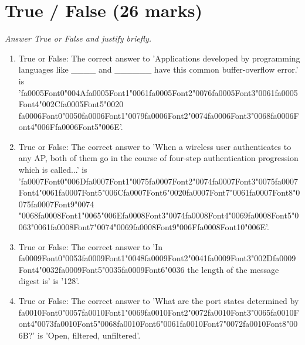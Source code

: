 \documentclass[12pt]{article}
\begin{document}
\section*{True / False (26 marks)}
\textit{Answer True or False and justify briefly.}
\begin{enumerate}[label=\arabic*.]
\item True or False: The correct answer to 'Applications developed by programming languages like \_\_\_\_ and \_\_\_\_\_\_ have this common buffer-overflow error.' is '{\csname fa0005Font0\endcsname\char"004A}{\csname fa0005Font1\endcsname\char"0061}{\csname fa0005Font2\endcsname\char"0076}{\csname fa0005Font3\endcsname\char"0061}{\csname fa0005Font4\endcsname\char"002C}{\csname fa0005Font5\endcsname\char"0020} {\csname fa0006Font0\endcsname\char"0050}{\csname fa0006Font1\endcsname\char"0079}{\csname fa0006Font2\endcsname\char"0074}{\csname fa0006Font3\endcsname\char"0068}{\csname fa0006Font4\endcsname\char"006F}{\csname fa0006Font5\endcsname\char"006E}'.
\item True or False: The correct answer to 'When a wireless user authenticates to any AP, both of them go in the course of four-step authentication progression which is called...' is '{\csname fa0007Font0\endcsname\char"006D}{\csname fa0007Font1\endcsname\char"0075}{\csname fa0007Font2\endcsname\char"0074}{\csname fa0007Font3\endcsname\char"0075}{\csname fa0007Font4\endcsname\char"0061}{\csname fa0007Font5\endcsname\char"006C}{\csname fa0007Font6\endcsname\char"0020}{\csname fa0007Font7\endcsname\char"0061}{\csname fa0007Font8\endcsname\char"0075}{\csname fa0007Font9\endcsname\char"0074} {\char"0068}{\csname fa0008Font1\endcsname\char"0065}{\char"006E}{\csname fa0008Font3\endcsname\char"0074}{\csname fa0008Font4\endcsname\char"0069}{\csname fa0008Font5\endcsname\char"0063}{\char"0061}{\csname fa0008Font7\endcsname\char"0074}{\char"0069}{\csname fa0008Font9\endcsname\char"006F}{\csname fa0008Font10\endcsname\char"006E}'.
\item True or False: The correct answer to 'In {\csname fa0009Font0\endcsname\char"0053}{\csname fa0009Font1\endcsname\char"0048}{\csname fa0009Font2\endcsname\char"0041}{\csname fa0009Font3\endcsname\char"002D}{\csname fa0009Font4\endcsname\char"0032}{\csname fa0009Font5\endcsname\char"0035}{\csname fa0009Font6\endcsname\char"0036} the length of the message digest is' is '128'.
\item True or False: The correct answer to 'What are the port states determined by {\csname fa0010Font0\endcsname\char"0057}{\csname fa0010Font1\endcsname\char"0069}{\csname fa0010Font2\endcsname\char"0072}{\csname fa0010Font3\endcsname\char"0065}{\csname fa0010Font4\endcsname\char"0073}{\csname fa0010Font5\endcsname\char"0068}{\csname fa0010Font6\endcsname\char"0061}{\csname fa0010Font7\endcsname\char"0072}{\csname fa0010Font8\endcsname\char"006B}?' is 'Open, filtered, unfiltered'.

\end{enumerate}
\end{document}
